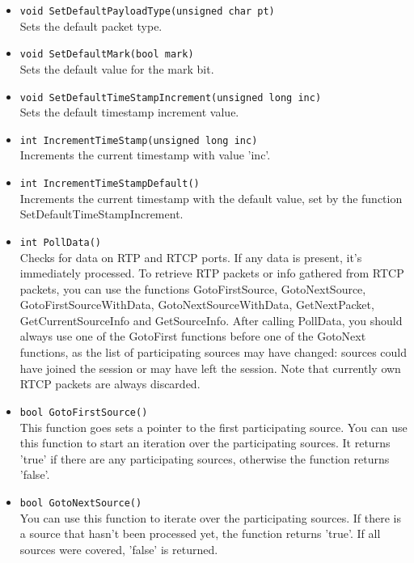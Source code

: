 \begin{itemize}
\item {\tt void SetDefaultPayloadType(unsigned char pt)}\\
	Sets the default packet type.

\item {\tt void SetDefaultMark(bool mark)}\\
	Sets the default value for the mark bit.

\item {\tt void SetDefaultTimeStampIncrement(unsigned long inc)}\\
	Sets the default timestamp increment value.

\item {\tt int IncrementTimeStamp(unsigned long inc)}\\
	Increments the current timestamp with value 'inc'.

\item {\tt int IncrementTimeStampDefault()}\\
	Increments the current timestamp with the default value, set by the
	function SetDefaultTimeStampIncrement.

\item {\tt int PollData()}\\
	Checks for data on RTP and RTCP ports. If any data is present, it's
	immediately processed. To retrieve RTP packets or info gathered from
	RTCP packets, you can use the functions GotoFirstSource, GotoNextSource,
	GotoFirstSourceWithData, GotoNextSourceWithData, GetNextPacket,
	GetCurrentSourceInfo and GetSourceInfo. After calling PollData, you
	should always use one of the GotoFirst functions before one of the
	GotoNext functions, as the list of participating sources may have
	changed: sources could have joined the session or may have left the
	session.
	Note that currently own RTCP packets are always discarded.

\item {\tt bool GotoFirstSource()}\\
	This function goes sets a pointer to the first participating source.
	You can use this function to start an iteration over the participating
	sources. It returns 'true' if there are any participating sources,
	otherwise the function returns 'false'.
	
\item {\tt bool GotoNextSource()}\\
	You can use this function to iterate over the participating sources.
	If there is a source that hasn't been processed yet, the function
	returns 'true'. If all sources were covered, 'false' is returned.


\end{itemize}
